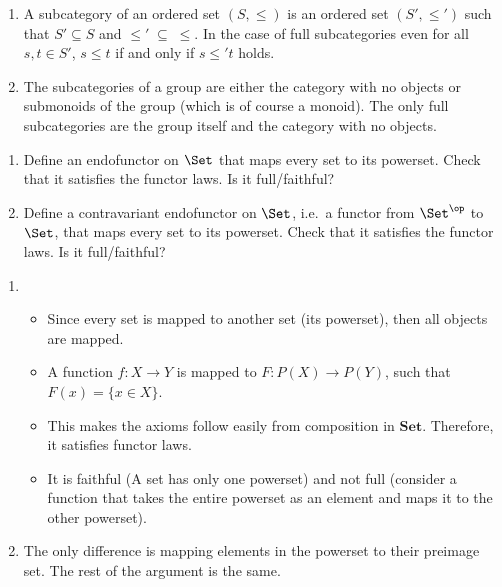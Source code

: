 \begin{answer}
  \begin{enumerate}
  \item A subcategory of an ordered set $(S,\leq)$ is an ordered set $(S',\leq')$ such that $S'\subseteq S$ and $\leq'\;\subseteq\;\leq$. In the case of full subcategories even for all $s,t\in S'$, $s\leq t$ if and only if $s\leq' t$ holds.
  \item The subcategories of a group are either the category with no objects or submonoids of the group (which is of course a monoid). The only full subcategories are the group itself and the category with no objects.
  \end{enumerate}
\end{answer}

\begin{exercise}
  \begin{enumerate}
    \item Define an endofunctor on $\Set$ that maps every set to its powerset.
      Check that it satisfies the functor laws.
      Is it full/faithful?
    \item Define a contravariant endofunctor on $\Set$, i.e.\ a functor from $\Set^\op$ to $\Set$, that maps every set to its powerset.
      Check that it satisfies the functor laws.
      Is it full/faithful?
  \end{enumerate}
\end{exercise}

\begin{answer}
\begin{enumerate}
\item
\begin{itemize}
\item Since every set is mapped to another set (its powerset), then all objects are mapped.
\item A function $f: X \rightarrow Y$ is mapped to $F: P(X) \rightarrow P(Y)$, such that $F(x)  = \{x \in X\}$.
\item This makes the axioms follow easily from composition in $\mathbf {Set}$. Therefore, it satisfies functor laws.
\item It is faithful (A set has only one powerset) and not full (consider a function that takes the entire powerset as an element and maps it to the other powerset).
\end{itemize}
\item
The only difference is mapping elements in the powerset to their preimage set. The rest of the argument is the same.
\end{enumerate}
\end{answer}

